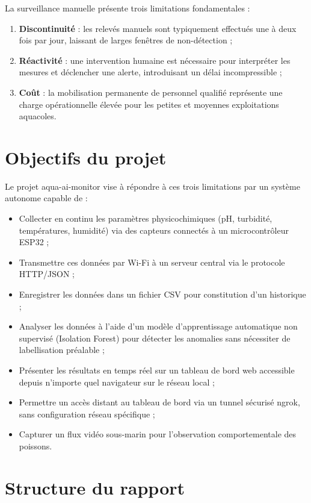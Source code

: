 \documentclass[12pt,a4paper]{report}
\begin{document}
La surveillance manuelle présente trois limitations fondamentales :
\begin{enumerate}
  \item \textbf{Discontinuité} : les relevés manuels sont typiquement effectués une à deux fois
        par jour, laissant de larges fenêtres de non-détection ;
  \item \textbf{Réactivité} : une intervention humaine est nécessaire pour interpréter les mesures
        et déclencher une alerte, introduisant un délai incompressible ;
  \item \textbf{Coût} : la mobilisation permanente de personnel qualifié représente une charge
        opérationnelle élevée pour les petites et moyennes exploitations aquacoles.
\end{enumerate}

\section{Objectifs du projet}

Le projet aqua-ai-monitor vise à répondre à ces trois limitations par un système autonome
capable de :

\begin{itemize}
  \item Collecter en continu les paramètres physicochimiques (pH, turbidité, températures,
        humidité) via des capteurs connectés à un microcontrôleur ESP32 ;
  \item Transmettre ces données par Wi-Fi à un serveur central via le protocole HTTP/JSON ;
  \item Enregistrer les données dans un fichier CSV pour constitution d'un historique ;
  \item Analyser les données à l'aide d'un modèle d'apprentissage automatique non supervisé
        (Isolation Forest) pour détecter les anomalies sans nécessiter de labellisation préalable ;
  \item Présenter les résultats en temps réel sur un tableau de bord web accessible depuis
        n'importe quel navigateur sur le réseau local ;
  \item Permettre un accès distant au tableau de bord via un tunnel sécurisé ngrok,
        sans configuration réseau spécifique ;
  \item Capturer un flux vidéo sous-marin pour l'observation comportementale des poissons.
\end{itemize}

\section{Structure du rapport}
\end{document}
